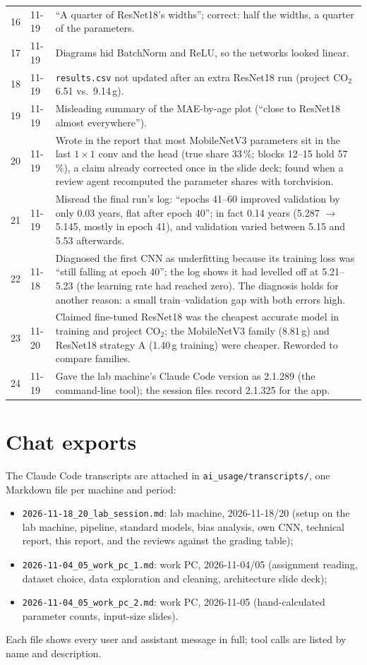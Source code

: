 \documentclass[10pt,a4paper]{article}
\newcommand{\cotwo}{CO$_2$}
\begin{document}
\begin{longtable}{@{}p{0.5cm}p{1.2cm}p{14.6cm}@{}}
16 & 11-19 & ``A quarter of ResNet18's widths''; correct: half the widths, a quarter of the parameters. \\
17 & 11-19 & Diagrams hid BatchNorm and ReLU, so the networks looked linear. \\
18 & 11-19 & \texttt{results.csv} not updated after an extra ResNet18 run (project \cotwo{} 6.51 vs.\ 9.14\,g). \\
19 & 11-19 & Misleading summary of the MAE-by-age plot (``close to ResNet18 almost everywhere''). \\
20 & 11-19 & Wrote in the report that most MobileNetV3 parameters sit in the last $1\times1$ conv and the head (true share 33\,\%; blocks 12--15 hold 57\,\%), a claim already corrected once in the slide deck; found when a review agent recomputed the parameter shares with torchvision. \\
21 & 11-19 & Misread the final run's log: ``epochs 41--60 improved validation by only 0.03 years, flat after epoch 40''; in fact 0.14 years (5.287 $\to$ 5.145, mostly in epoch 41), and validation varied between 5.15 and 5.53 afterwards. \\
22 & 11-18 & Diagnosed the first CNN as underfitting because its training loss was ``still falling at epoch 40''; the log shows it had levelled off at 5.21--5.23 (the learning rate had reached zero). The diagnosis holds for another reason: a small train--validation gap with both errors high. \\
23 & 11-20 & Claimed fine-tuned ResNet18 was the cheapest accurate model in training and project \cotwo{}; the MobileNetV3 family (8.81\,g) and ResNet18 strategy A (1.40\,g training) were cheaper. Reworded to compare families. \\
24 & 11-19 & Gave the lab machine's Claude Code version as 2.1.289 (the command-line tool); the session files record 2.1.325 for the app. \\
\bottomrule
\end{longtable}
\normalsize

\section{Chat exports}
The Claude Code transcripts are attached in \texttt{ai\_usage/transcripts/}, one Markdown file per machine and period:
\begin{itemize}
\item \texttt{2026-11-18\_20\_lab\_session.md}: lab machine, 2026-11-18/20 (setup on the lab machine, pipeline, standard models, bias analysis, own CNN, technical report, this report, and the reviews against the grading table);
\item \texttt{2026-11-04\_05\_work\_pc\_1.md}: work PC, 2026-11-04/05 (assignment reading, dataset choice, data exploration and cleaning, architecture slide deck);
\item \texttt{2026-11-04\_05\_work\_pc\_2.md}: work PC, 2026-11-05 (hand-calculated parameter counts, input-size slides).
\end{itemize}
Each file shows every user and assistant message in full; tool calls are listed by name and description.
\end{document}
